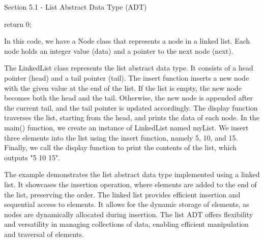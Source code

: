 \begin{notes}{Section 5.1 - List Abstract Data Type (ADT)}
\begin{highlight}
\begin{code}[C++]
{        return 0;
    }
    \end{code}
        In this code, we have a Node class that represents a node in a linked list. Each node holds an integer value (data) and a pointer to the next node (next).
    
        The LinkedList class represents the list abstract data type. It consists of a head pointer (head) and a tail pointer (tail). The insert function inserts a new node with the given value at the end of the list. If the list 
        is empty, the new node becomes both the head and the tail. Otherwise, the new node is appended after the current tail, and the tail pointer is updated accordingly. The display function traverses the list, starting from 
        the head, and prints the data of each node. In the main() function, we create an instance of LinkedList named myList. We insert three elements into the list using the insert function, namely 5, 10, and 15. Finally, we call the display function to print the contents 
        of the list, which outputs "5 10 15".
    
        The example demonstrates the list abstract data type implemented using a linked list. It showcases the insertion operation, where elements are added to the end of the list, preserving the order. The linked list provides 
        efficient insertion and sequential access to elements. It allows for the dynamic storage of elements, as nodes are dynamically allocated during insertion. The list ADT offers flexibility and versatility in managing collections 
        of data, enabling efficient manipulation and traversal of elements.
    \end{highlight}
\end{notes}

